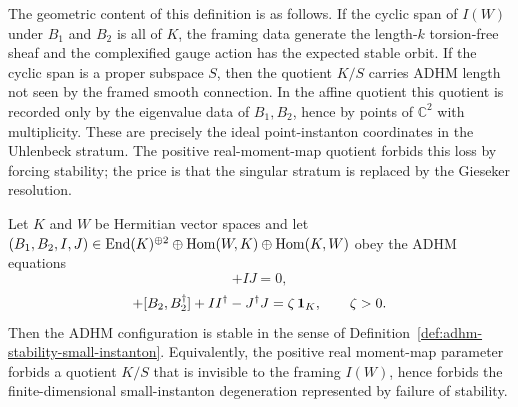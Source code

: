 The geometric content of this definition is as follows.  If the cyclic span of
\(I(W)\) under \(B_1\) and \(B_2\) is all of \(K\), the
framing data generate the length-\(k\) torsion-free sheaf and the
complexified gauge action has the expected stable orbit.  If the cyclic span
is a proper subspace \(S\), then the quotient \(K/S\) carries ADHM length not
seen by the framed smooth connection.  In the affine quotient this quotient
is recorded only by the eigenvalue data of \(B_1,B_2\), hence by points of
\(\mathbb C^2\) with multiplicity.  These are precisely the ideal
point-instanton coordinates in the Uhlenbeck stratum.  The positive
real-moment-map quotient forbids this loss by forcing stability; the price is
that the singular stratum is replaced by the Gieseker resolution.

\begin{proposition}
\label{prop:positive-adhm-moment-map-stability}
Let \(K\) and \(W\) be Hermitian vector spaces and let
\((B_1,B_2,I,J)\in{\rm End}(K)^{\oplus2}\oplus{\rm Hom}(W,K)
\oplus{\rm Hom}(K,W)\) obey the ADHM equations
\begin{equation}
  [B_1,B_2]+IJ=0,
  \label{eq:positive-adhm-complex-moment-map}
\end{equation}
\begin{equation}
  [B_1,B_1^\dagger]+[B_2,B_2^\dagger]
  +II^\dagger-J^\dagger J
  =
  \zeta\,{\bf 1}_K ,
  \qquad \zeta>0 .
  \label{eq:adhm-real-moment-map-positive}
\end{equation}
Then the ADHM configuration is stable in the sense of
Definition~\ref{def:adhm-stability-small-instanton}.  Equivalently, the
positive real moment-map parameter forbids a quotient \(K/S\) that is
invisible to the framing \(I(W)\), hence forbids the finite-dimensional
small-instanton degeneration represented by failure of stability.
\end{proposition}

